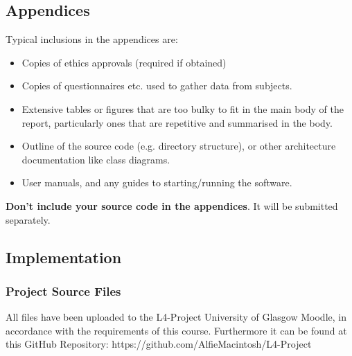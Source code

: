 \documentclass{l4proj}
\begin{document}
\begin{appendices}

\chapter{Appendices}

Typical inclusions in the appendices are:

\begin{itemize}
\item
  Copies of ethics approvals (required if obtained)
\item
  Copies of questionnaires etc. used to gather data from subjects.
\item
  Extensive tables or figures that are too bulky to fit in the main body of
  the report, particularly ones that are repetitive and summarised in the body.

\item Outline of the source code (e.g. directory structure), or other architecture documentation like class diagrams.

\item User manuals, and any guides to starting/running the software.

\end{itemize}

\textbf{Don't include your source code in the appendices}. It will be
submitted separately.

\section{Implementation}
\subsection{Project Source Files} \label{appendix:source_files}
All files have been uploaded to the L4-Project University of Glasgow Moodle, in accordance with the requirements of this course. Furthermore it can be found at this GitHub Repository: https://github.com/AlfieMacintosh/L4-Project
\newpage

\end{appendices}
\end{document}
